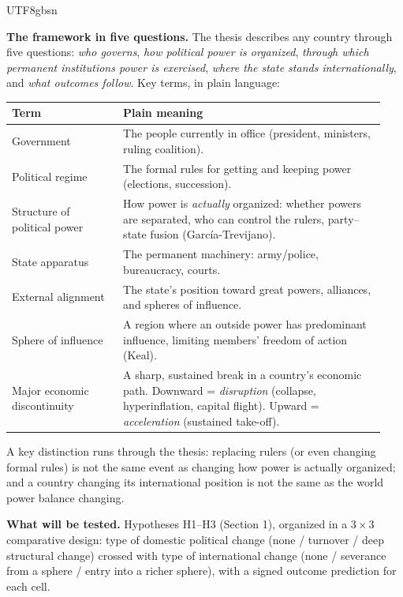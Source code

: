 \documentclass[10pt]{article}
\begin{document}
\begin{CJK}{UTF8}{gbsn}
\newpage


\vspace{6pt}
\noindent\textbf{The framework in five questions.} The thesis describes any country through five questions: \emph{who governs}, \emph{how political power is organized}, \emph{through which permanent institutions power is exercised}, \emph{where the state stands internationally}, and \emph{what outcomes follow}. Key terms, in plain language:

\begin{center}\small
\begin{tabular}{p{0.28\linewidth} p{0.66\linewidth}}
\toprule
\textbf{Term} & \textbf{Plain meaning} \\
\midrule
Government & The people currently in office (president, ministers, ruling coalition). \\
Political regime & The formal rules for getting and keeping power (elections, succession). \\
Structure of political power & How power is \emph{actually} organized: whether powers are separated, who can control the rulers, party--state fusion (Garc\'ia-Trevijano). \\
State apparatus & The permanent machinery: army/police, bureaucracy, courts. \\
External alignment & The state's position toward great powers, alliances, and spheres of influence. \\
Sphere of influence & A region where an outside power has predominant influence, limiting members' freedom of action (Keal). \\
Major economic discontinuity & A sharp, sustained break in a country's economic path. Downward = \emph{disruption} (collapse, hyperinflation, capital flight). Upward = \emph{acceleration} (sustained take-off). \\
\bottomrule
\end{tabular}
\end{center}

A key distinction runs through the thesis: replacing rulers (or even changing formal rules) is not the same event as changing how power is actually organized; and a country changing its international position is not the same as the world power balance changing.

\noindent\textbf{What will be tested.} Hypotheses H1--H3 (Section 1), organized in a $3 \times 3$ comparative design: type of domestic political change (none / turnover / deep structural change) crossed with type of international change (none / severance from a sphere / entry into a richer sphere), with a signed outcome prediction for each cell.


\end{CJK}
\end{document}
